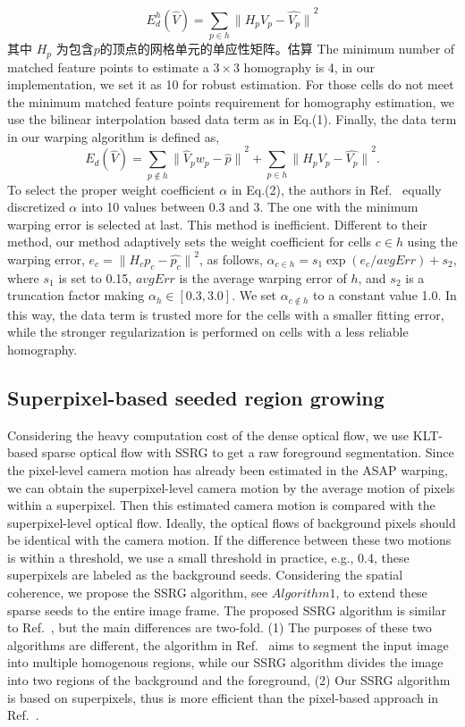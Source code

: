 $$E^{h}_{d}(\hat{V}) = \sum_{p\in h}{\parallel H_{p}V_{p} - \hat{V_{p}}\parallel}^2$$
其中 $H_{p}$ 为包含$p$的顶点的网格单元的单应性矩阵。估算 The minimum number of matched feature points to estimate a $3\times3$ homography is 4, in our implementation, we set it as 10 for robust estimation.  For those cells do not meet the minimum matched feature points requirement for homography estimation, we use the bilinear interpolation based data  term as in Eq.(1). Finally, the data term in our warping algorithm is defined as,
$${E}_{d}(\hat{V}) = \sum_{p \notin h}{\parallel\hat{V}_{p}{w}_{p}- \hat{p}\parallel}^{2} +
\sum_{p\in h}{\parallel {H_{p}V_{p} - \hat{V_{p}}}\parallel}^2.$$
To select the proper weight coefficient \(\alpha\) in Eq.(2), the authors in Ref.~ equally discretized $\alpha$ into 10 values between 0.3 and 3. The one with the minimum warping error is selected at last. This method is inefficient. Different to their method, our method adaptively sets the weight coefficient for cells  $c \in h$ using the warping error, $e_{c} = {\parallel H_{c}p_{c} - \hat{p_{c}} \parallel}^2 $, as follows, $\alpha_{c\in h} = s_{1}\exp({e_{c}/avgErr})+ s_{2}$, where $s_{1}$ is set to 0.15, $avgErr$ is the average warping error of $h$, and $s_{2}$ is a truncation factor making $\alpha_{h} \in [0.3,3.0]$. We set $\alpha_{c \notin h}$ to a constant value 1.0. In this way, the data term  is trusted more for the cells with a smaller fitting error, while the stronger regularization is performed on cells with a less reliable homography.
\subsection{Superpixel-based seeded region growing}
\label{sec:3.2}
Considering the heavy computation cost of the dense optical flow, we use KLT-based sparse optical flow with SSRG to get a raw foreground segmentation. Since the pixel-level camera motion has already been estimated in the ASAP warping, we can obtain the superpixel-level camera motion by the average motion of pixels within a superpixel. Then this estimated camera motion is compared with the superpixel-level optical flow. Ideally, the optical flows of background pixels should be identical with the camera motion. If the difference between these two motions is within a threshold, we use a small threshold in practice, e.g., 0.4, these superpixels are labeled as the background seeds. Considering the spatial coherence, we propose the SSRG algorithm, see $Algorithm 1$, to extend these sparse seeds to the entire image frame. The proposed SSRG algorithm is similar to Ref.~, but the main differences are two-fold. (1) The purposes of these two algorithms are different, the algorithm in Ref.~ aims to segment the input image into multiple homogenous regions, while our SSRG algorithm divides the image into two regions of the background and the foreground, (2) Our SSRG algorithm is based on superpixels, thus is more efficient than the pixel-based approach in Ref.~.

